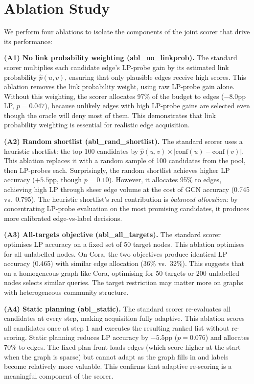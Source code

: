 \documentclass[12pt,a4paper,oneside]{report}
\begin{document}
\section{Ablation Study}
\label{sec:ablations}

We perform four ablations to isolate the components of the joint scorer that drive its performance:

\textbf{(A1) No link probability weighting (abl\_no\_linkprob).} The standard scorer multiplies each candidate edge's LP-probe gain by its estimated link probability $\hat{p}(u,v)$, ensuring that only plausible edges receive high scores. This ablation removes the link probability weight, using raw LP-probe gain alone. Without this weighting, the scorer allocates 97\% of the budget to edges ($-8.0$pp LP, $p = 0.047$), because unlikely edges with high LP-probe gains are selected even though the oracle will deny most of them. This demonstrates that link probability weighting is essential for realistic edge acquisition.

\textbf{(A2) Random shortlist (abl\_rand\_shortlist).} The standard scorer uses a heuristic shortlist: the top 100 candidates by $\hat{p}(u,v) \times |\text{conf}(u) - \text{conf}(v)|$. This ablation replaces it with a random sample of 100 candidates from the pool, then LP-probes each. Surprisingly, the random shortlist achieves higher LP accuracy ($+5.5$pp, though $p = 0.10$). However, it allocates 95\% to edges, achieving high LP through sheer edge volume at the cost of GCN accuracy (0.745 vs.\ 0.795). The heuristic shortlist's real contribution is \emph{balanced allocation}: by concentrating LP-probe evaluation on the most promising candidates, it produces more calibrated edge-vs-label decisions.

\textbf{(A3) All-targets objective (abl\_all\_targets).} The standard scorer optimises LP accuracy on a fixed set of 50 target nodes. This ablation optimises for all unlabelled nodes. On Cora, the two objectives produce identical LP accuracy (0.465) with similar edge allocation (36\% vs.\ 32\%). This suggests that on a homogeneous graph like Cora, optimising for 50 targets or 200 unlabelled nodes selects similar queries. The target restriction may matter more on graphs with heterogeneous community structure.

\textbf{(A4) Static planning (abl\_static).} The standard scorer re-evaluates all candidates at every step, making acquisition fully adaptive. This ablation scores all candidates once at step 1 and executes the resulting ranked list without re-scoring. Static planning reduces LP accuracy by $-5.5$pp ($p = 0.076$) and allocates 70\% to edges. The fixed plan front-loads edges (which score higher at the start when the graph is sparse) but cannot adapt as the graph fills in and labels become relatively more valuable. This confirms that adaptive re-scoring is a meaningful component of the scorer.
\end{document}

